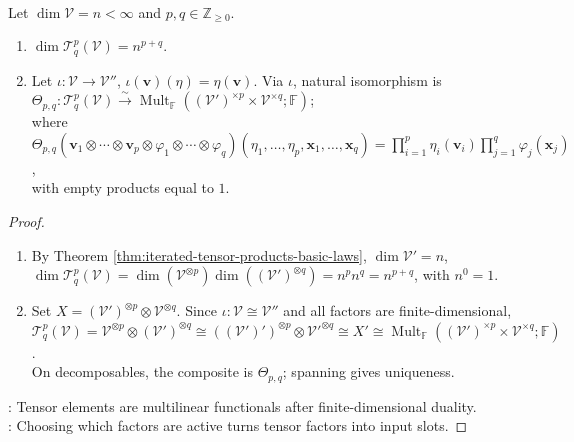 \begin{proposition} \label{prop:tensor-spaces-as-multilinear-functionals} \\
Let $\dim\mathcal{V}=n<\infty$ and $p,q\in\mathbb{Z}_{\geq0}$.
\begin{enumerate}[label=(\roman*)]
\setlength{\itemsep}{0pt}
\item $\dim\mathcal{T}^{p}_{q}(\mathcal{V})=n^{p+q}$.
\item Let $\iota:\mathcal{V}\to\mathcal{V}''$, $\iota(\mathbf{v})(\eta)=\eta(\mathbf{v})$. Via $\iota$, natural isomorphism is $\Theta_{p,q}:\mathcal{T}^{p}_{q}(\mathcal{V})\xrightarrow{\sim}\operatorname{Mult}_{\mathbb{F}}((\mathcal{V}')^{\times p}\times\mathcal{V}^{\times q};\mathbb{F})$;\\
where $\Theta_{p,q}(\mathbf{v}_1\otimes\cdots\otimes\mathbf{v}_p\otimes\varphi_1\otimes\cdots\otimes\varphi_q)(\eta_1,\ldots,\eta_p,\mathbf{x}_1,\ldots,\mathbf{x}_q)=\prod_{i=1}^{p}\eta_i(\mathbf{v}_i)\prod_{j=1}^{q}\varphi_j(\mathbf{x}_j)$,\\
with empty products equal to $1$.
\end{enumerate}
\begin{proof}
\begin{enumerate}[label=(\roman*)]
\setlength{\itemsep}{0pt}
\item By Theorem \ref{thm:iterated-tensor-products-basic-laws}, $\dim\mathcal{V}'=n$, $\dim\mathcal{T}^{p}_{q}(\mathcal{V})=\dim(\mathcal{V}^{\otimes p})\dim((\mathcal{V}')^{\otimes q})=n^pn^q=n^{p+q}$, with $n^0=1$.
\item Set $X=(\mathcal{V}')^{\otimes p}\otimes\mathcal{V}^{\otimes q}$. Since $\iota:\mathcal{V}\cong\mathcal{V}''$ and all factors are finite-dimensional,\\
$\mathcal{T}^{p}_{q}(\mathcal{V})=\mathcal{V}^{\otimes p}\otimes(\mathcal{V}')^{\otimes q} \cong((\mathcal{V}')')^{\otimes p}\otimes\mathcal{V}'^{\otimes q} \cong X' \cong\operatorname{Mult}_{\mathbb{F}}((\mathcal{V}')^{\times p}\times\mathcal{V}^{\times q};\mathbb{F})$.\\
On decomposables, the composite is $\Theta_{p,q}$; spanning gives uniqueness.
\end{enumerate}
: Tensor elements are multilinear functionals after finite-dimensional duality.\\
: Choosing which factors are active turns tensor factors into input slots.
\end{proof}
\end{proposition}

